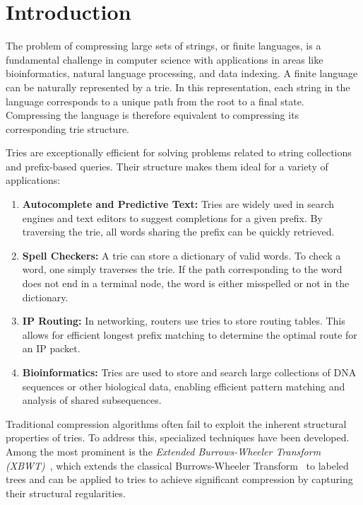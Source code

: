 \chapter{Introduction} \label{chp:introduction}
The problem of compressing large sets of strings, or finite languages, is a fundamental challenge in computer science with applications in areas like bioinformatics, natural language processing, and data indexing. A finite language can be naturally represented by a trie. In this representation, each string in the language corresponds to a unique path from the root to a final state. Compressing the language is therefore equivalent to compressing its corresponding trie structure.

Tries are exceptionally efficient for solving problems related to string collections and prefix-based queries. Their structure makes them ideal for a variety of applications:
\begin{enumerate}
    \item \textbf{Autocomplete and Predictive Text:} Tries are widely used in search engines and text editors to suggest completions for a given prefix. By traversing the trie, all words sharing the prefix can be quickly retrieved.
    \item \textbf{Spell Checkers:} A trie can store a dictionary of valid words. To check a word, one simply traverses the trie. If the path corresponding to the word does not end in a terminal node, the word is either misspelled or not in the dictionary.
    \item \textbf{IP Routing:} In networking, routers use tries to store routing tables. This allows for efficient longest prefix matching to determine the optimal route for an IP packet.
    \item \textbf{Bioinformatics:} Tries are used to store and search large collections of DNA sequences or other biological data, enabling efficient pattern matching and analysis of shared subsequences.
\end{enumerate}

Traditional compression algorithms often fail to exploit the inherent structural properties of tries. To address this, specialized techniques have been developed. Among the most prominent is the \textit{Extended Burrows-Wheeler Transform (XBWT)}~\cite{ferragina2009compressing}, which extends the classical Burrows-Wheeler Transform~\cite{burrows1994block} to labeled trees and can be applied to tries to achieve significant compression by capturing their structural regularities.

